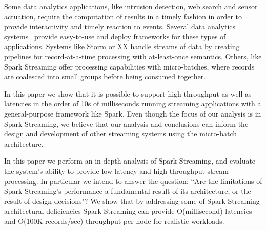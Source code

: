 \noindent Some data analytics applications, like intrusion detection, web search and sensor actuation,
require the computation of results in a timely fashion in order to provide interactivity and timely reaction to events.
Several data analytics systems~\cite{Babu:2001:CQO:603867.603884,TelegraphCQ,Storm,SparkStreaming,Trill,Naiad,Niagara,StreamInsight,Carney:2002:MSN:1287369.1287389,Sullivan:1998:TSM:1268256.1268258,Condie:2010:MO:1855711.185573,Brito:2011:SLD:2114498.2116192} provide easy-to-use and deploy frameworks for these types of applications. 
Systems like Storm or XX  handle streams of data by creating pipelines for record-at-a-time processing with at-least-once semantics. 
Others, like Spark Streaming offer processing capabilities with micro-batches, where records are coalesced into small groups before being consumed together.

In this paper we show that it is possible to support high throughput as well as latencies in the order of 10s of milliseconds running streaming applications with a general-purpose framework like Spark.
Even though the focus of our analysis is in Spark Streaming, we believe that our analysis and conclusions can inform the design and development of other streaming systems using the micro-batch architecture.


In this paper we perform an in-depth analysis of Spark Streaming, and evaluate the system's ability to provide low-latency and high throughput stream processing.
In particular we intend to answer the question: ``Are the limitations of Spark Streaming's performance a fundamental result of its architecture, or the result of design decisions"?
We show that by addressing some of Spark Streaming architectural deficiencies Spark Streaming can provide O(millisecond) latencies and O(100K records/sec) throughput per node for realistic workloads. 


